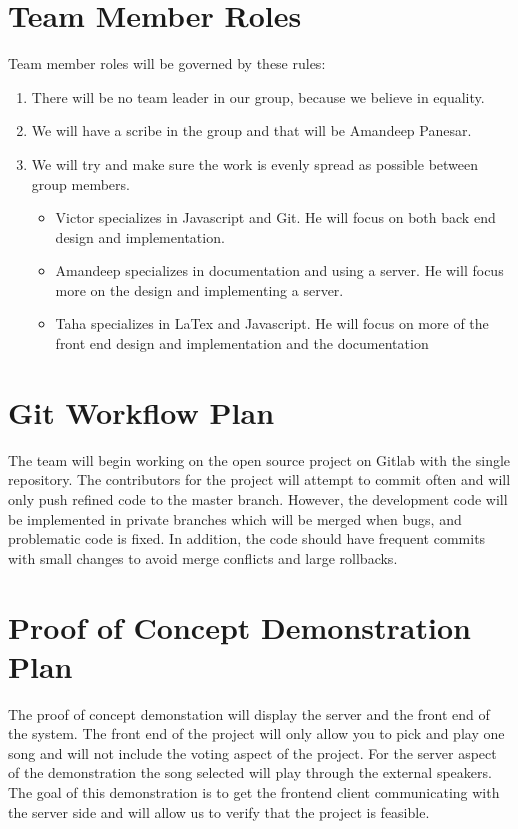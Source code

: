 \documentclass{article}
\begin{document}
\section{Team Member Roles}
Team member roles will be governed by these rules:
\begin{enumerate}
\item There will be no team leader in our group, because we believe in equality.
\item We will have a scribe in the group and that will be Amandeep Panesar.
\item We will try and make sure the work is evenly spread as possible between group members.
\begin{itemize}
\item Victor specializes in Javascript and Git. He will focus on both back end design and implementation.
\item Amandeep specializes in documentation and using a server. He will focus more on the design and implementing a server.
\item Taha specializes in LaTex and Javascript. He will focus on more of the front end design and implementation and the documentation
\end{itemize}
\end{enumerate}
\section{Git Workflow Plan}
The team will begin working on the open source project on Gitlab with the single repository. The contributors for the project will attempt to commit often and will only push refined code to the master branch. However, the development code will be implemented in private branches which will be merged when bugs, and problematic code is fixed. In addition, the code should have frequent commits with small changes to avoid merge conflicts and large rollbacks.
\section{Proof of Concept Demonstration Plan}
The proof of concept demonstation will display the server and the front end of the system. The front end of the project will only allow you to pick and play one song and will not include the voting aspect of the project. For the server aspect of the demonstration the song selected will play through the external speakers. The goal of this demonstration is to get the frontend client communicating with the server side and will allow us to verify that the project is feasible.
\end{document}
